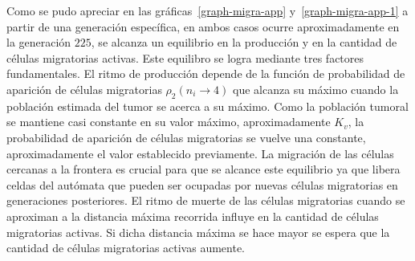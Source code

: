 Como se pudo apreciar en las gr\'aficas~\ref{graph-migra-app} y~\ref{graph-migra-app-1} a partir de una generaci\'on espec\'ifica, en ambos casos ocurre aproximadamente en la generaci\'on $225$, se alcanza un equilibrio en la producci\'on y en la cantidad de c\'elulas migratorias activas. Este equilibro se logra mediante tres factores fundamentales. El ritmo de producci\'on depende de la funci\'on de probabilidad de aparici\'on de c\'elulas migratorias $\rho_2(n_i \rightarrow 4)$ que alcanza su m\'aximo cuando la poblaci\'on estimada del tumor se acerca a su m\'aximo. Como la poblaci\'on tumoral se mantiene casi constante en su valor m\'aximo, aproximadamente $K_v$, la probabilidad de aparici\'on de c\'elulas migratorias se vuelve una constante, aproximadamente el valor establecido previamente. La migraci\'on de las c\'elulas cercanas a la frontera es crucial para que se alcance este equilibrio ya que libera celdas del aut\'omata que pueden ser ocupadas por nuevas c\'elulas migratorias en generaciones posteriores. El ritmo de muerte de las c\'elulas migratorias cuando se aproximan a la distancia m\'axima recorrida influye en la cantidad de c\'elulas migratorias activas. Si dicha distancia m\'axima se hace mayor se espera que la cantidad de c\'elulas migratorias activas aumente.

